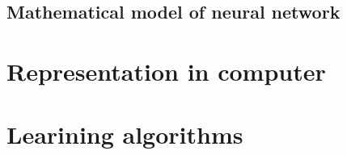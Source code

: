 \FloatBarrier
\subsection{Mathematical model of neural network}


\FloatBarrier
\section{Representation in computer}

\FloatBarrier
\section{Learining algorithms}

\FloatBarrier
